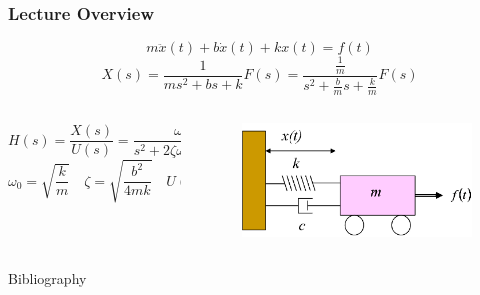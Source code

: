 \documentclass[aspectratio=169]{beamer}
\begin{document}
\section*{}

\begin{frame}
	\frametitle{Lecture Overview}
	\[
		m \ddot{x}(t) + b \dot{x}(t) + k x(t) = f(t)
	\]
	\[
		X(s) = \frac{1}{m s^2 + b s + k} F(s) 
		= \frac{\frac{1}{m}}{s^2 + \frac{b}{m} s + \frac{k}{m}} F(s)
	\]
	\begin{columns}
		\begin{column}{0.5\textwidth}
			\[
				H(s) = \frac{X(s)}{U(s)}
				= \frac{
					\omega_0^2
				}{
					s^2 + 2 \zeta \omega_0 s + \omega_0^2
				}
			\]		
	\[
		\omega_0 = \sqrt{\frac{k}{m}}
		\quad
		\zeta = \sqrt{\frac{b^2}{4 m k}}
		\quad
		U(s) = \frac{1}{k} F(s)
	\]
		\end{column}
		\begin{column}{0.25 \textwidth}
			\begin{figure}[]
				\includegraphics[width=\textwidth]{Images/SpringMassDamper_cartSystem.png}
			\end{figure}
		\end{column}
	\end{columns}
\end{frame}

\begin{frame}[allowframebreaks]{Bibliography}
	
	
\end{frame}
\end{document}
